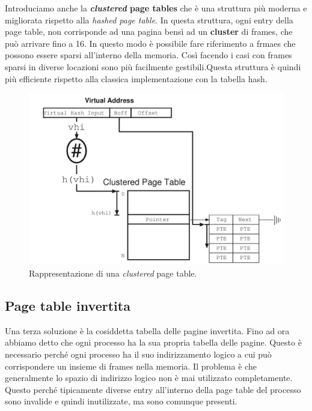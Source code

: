 Introduciamo anche la \textbf{\textit{clustered} page tables} che è una struttura più moderna e migliorata rispetto alla \textit{hashed page table}. In questa struttura, ogni entry della page table, non corrisponde ad una pagina bensì ad un \textbf{cluster} di frames, che può arrivare fino a 16. In questo modo è possibile fare riferimento a frmaes che possono essere sparsi all'interno della memoria. Così facendo i casi con frames sparsi in diverse locazioni sono più facilmente gestibili.Questa struttura è quindi più efficiente rispetto alla classica implementazione con la tabella hash.
\begin{figure}[h]
    \centering
    \includegraphics[width = .5\textwidth]{../res/imgs/main memory/clustered_page_table.png}
    \caption{Rappresentazione di una \textit{clustered} page table.}
    \label{fig:clustered_page_table}
\end{figure}

% 
\subsection{Page table invertita}
Una terza soluzione è la cosiddetta tabella delle pagine invertita. Fino ad ora abbiamo detto che ogni processo ha la sua propria tabella delle pagine. Questo è necessario perché ogni processo ha il suo indirizzamento logico a cui può corrispondere un insieme di frames nella memoria. Il problema è che generalmente lo spazio di indirizzo logico non è mai utilizzato completamente. Questo perché tipicamente diverse entry all'interno della page table del processo sono invalide e quindi inutilizzate, ma sono comunque presenti.

